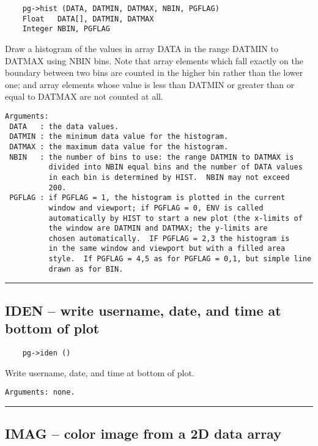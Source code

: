 \begin{verbatim}
    pg->hist (DATA, DATMIN, DATMAX, NBIN, PGFLAG)
    Float   DATA[], DATMIN, DATMAX
    Integer NBIN, PGFLAG
\end{verbatim}

Draw a histogram of the values in array DATA in the range DATMIN to
DATMAX using NBIN bins.  Note that array elements which fall exactly
on the boundary between two bins are counted in the higher bin
rather than the lower one; and array elements whose value is less than
DATMIN or greater than or equal to DATMAX are not counted at all.

\begin{verbatim}
Arguments:
 DATA   : the data values.
 DATMIN : the minimum data value for the histogram. 
 DATMAX : the maximum data value for the histogram.
 NBIN   : the number of bins to use: the range DATMIN to DATMAX is
          divided into NBIN equal bins and the number of DATA values
          in each bin is determined by HIST.  NBIN may not exceed
          200. 
 PGFLAG : if PGFLAG = 1, the histogram is plotted in the current
          window and viewport; if PGFLAG = 0, ENV is called
          automatically by HIST to start a new plot (the x-limits of
          the window are DATMIN and DATMAX; the y-limits are
          chosen automatically.  IF PGFLAG = 2,3 the histogram is
          in the same window and viewport but with a filled area
          style.  If PGFLAG = 4,5 as for PGFLAG = 0,1, but simple line
          drawn as for BIN.

\end{verbatim}

\hrule

\subsection*{IDEN -- write username, date, and time at bottom of plot }

\begin{verbatim}
    pg->iden ()
\end{verbatim}

Write username, date, and time at bottom of plot.

\begin{verbatim}
Arguments: none.
\end{verbatim}

\hrule

\subsection*{IMAG -- color image from a 2D data array }

